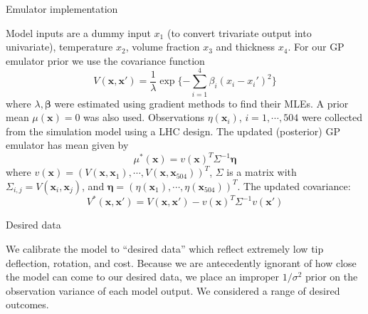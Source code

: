 \documentclass[final]{beamer}
\newlength{\onecolwid}
\newlength{\twocolwid}
\begin{document}
\begin{frame}[t]
\begin{columns}[t]
\begin{column}{\twocolwid}
\begin{columns}[t,totalwidth=\twocolwid]
\begin{column}{\onecolwid}
\begin{alertblock}{Emulator implementation}

Model inputs are a dummy input $x_1$ (to convert trivariate output into univariate), temperature $x_2$, volume fraction $x_3$ and thickness $x_4$. For our GP emulator prior we use the covariance function
\[
V(\mathbf x,\mathbf x' ) = \frac1\lambda \exp\{-\sum_{i=1}^4 \beta_i(x_i-x_i')^2 \}
\]
where $\lambda,\boldsymbol \beta$ were estimated using gradient methods to find their MLEs. 
A prior mean $\mu(\mathbf x) = 0$ was also used. Observations $\eta(\mathbf x_i)$, $i=1,\cdots,504$ were collected from the simulation model using a LHC design. %
The updated (posterior) GP emulator has mean given by
\[\mu^*(\mathbf x) = v(\mathbf x)^T \Sigma^{-1} \boldsymbol \eta \]
where $v(\mathbf x) = (V(\mathbf x, \mathbf x_1),\cdots,V(\mathbf x,\mathbf x_{504}))^T$, $\Sigma$ is a matrix with $\Sigma_{i,j} = V(\mathbf x_i,\mathbf x_j)$, and $\boldsymbol \eta = (\eta(\mathbf x_1),\cdots,\eta(\mathbf x_{504}))^T$. The updated covariance:
\[
V^* (\mathbf x, \mathbf x') = V(\mathbf x, \mathbf x') - v(\mathbf x)^T \Sigma^{-1} v(\mathbf x')
\]
\end{alertblock}


\begin{alertblock}{Desired data}

We calibrate the model to ``desired data'' which reflect extremely low tip deflection, rotation, and cost. Because we are antecedently ignorant of how close the model can come to our desired data, we place an improper $1/\sigma^2$ prior on the observation variance of each model output. We considered a range of desired outcomes.

\end{alertblock}

\end{column} %

\end{columns} %






\end{column}
\end{columns}
\end{frame}
\end{document}
